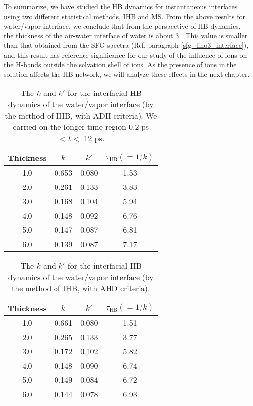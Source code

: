 To summarize, we have studied the HB dynamics for instantaneous interfaces using two different statistical methods, IHB and MS.
From the above results for water/vapor interface, we conclude that from the perspective of HB dynamics,
the thickness of the air-water interface of water is about 3 \A. This value is smaller than that obtained from the SFG spectra 
(Ref. paragraph \thinspace\ref{sfg_lino3_interface}), and this result has reference significance for our study of the influence of ions on the H-bonds 
outside the solvation shell of ions. 
As the presence of ions in the solution affects the HB network, we will analyze these effects in the next chapter.
%
\begin{table}[H]%
\centering
\caption{\label{tab:k_k_prime_tau_128w_pure_ihb_ADH} 
    The $k$ and $k'$ for the interfacial HB dynamics of the water/vapor interface (by the method of IHB, with ADH criteria). 
We carried on the longer time region 0.2 ps $< t <$ 12 ps. 
}
\begin{tabular}{cccc}
 Thickness & $k$ & $k'$ & $\tau_{\text{HB}} (=1/k)$ \\
\hline
  1.0 & 0.653 & 0.080 & 1.53  \\
  2.0 & 0.261 & 0.133 & 3.83  \\
  3.0 & 0.168 & 0.104 & 5.94  \\
  4.0 & 0.148 & 0.092 & 6.76  \\
  5.0 & 0.147 & 0.087 & 6.81  \\
  6.0 & 0.139 & 0.087 & 7.17  \\
\end{tabular}
\end{table}
\begin{table}[htb]
\centering
\caption{\label{tab:k_k_prime_tau_128w_pure_ihb_AHD} 
    The $k$ and $k'$ for the interfacial HB dynamics of the water/vapor interface (by the method of IHB, with AHD criteria).} 
\begin{tabular}{cccc}
 Thickness & $k$ & $k'$ & $\tau_{\text{HB}} (=1/k)$ \\
\hline
  1.0 & 0.661 & 0.080 & 1.51  \\
  2.0 & 0.265 & 0.133 & 3.77  \\
  3.0 & 0.172 & 0.102 & 5.82  \\
  4.0 & 0.148 & 0.090 & 6.74  \\
  5.0 & 0.149 & 0.084 & 6.72  \\
  6.0 & 0.144 & 0.078 & 6.93  \\
\end{tabular}
\end{table}

